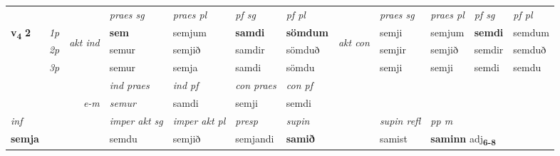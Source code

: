 \begin{longtable}[l]{X>{\footnotesize\itshape}llXXXXlXXXX}
\midrule

 & &   & \textit{praes sg}  & \textit{praes pl}    & \textit{ pf sg} & \textit{pf pl} & & \textit{praes sg}  & \textit{praes pl}    & \textit{pf sg} & \textit{pf pl }  \\ \cmidrule{4-7} \cmidrule{9-12}
 \multirow{2}{*}{{{\textbf{v{\textsubscript{4}}} \Large{\textbf{2}}}}}  & 1p & \multirow{3}{*}{\begin{turn}{90}\textit{akt ind}\end{turn}} & \textbf{sem} & semjum & \textbf{samdi} & \textbf{sömdum} & \multirow{3}{*}{\begin{turn}{90}\textit{akt con}\end{turn}} &semji & semjum & \textbf{semdi} & semdum\\*
 & 2p &  &  semur  & semjið & samdir & sömduð & & semjir & semjið & semdir & semduð \\*
 & 3p &  & semur & semja & samdi & sömdu & & semji & semji& semdi & semdu \\*
\cmidrule{4-7} \cmidrule{9-12}

   && &  \textit{ind praes} & \textit{ind pf} & \textit{con praes} & \textit{con pf} \\*
\multicolumn{3}{r}{\textit{e-m}} & semur & samdi & semji & semdi \\*

\cmidrule{4-7}
   {\textit{inf}} & &  & \textit{imper akt sg} & \textit{imper akt pl}   & \textit{presp} & \textit{supin} && \textit{supin refl} & \textit{pp m} \\*
  {\textbf{semja}} & && semdu  & semjið   & semjandi &  \textbf{samið} && samist & \multicolumn{2}{l}{\textbf{saminn} adj\textbf{\textsubscript{6-8}}} \\*

\midrule


\end{longtable}
